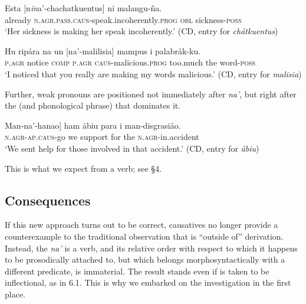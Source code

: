 \documentclass[output=paper,
modfonts
]{LSP/langsci}
\begin{document}
\begin{exe}
\begin{xlist}
\ea \label{ex:chung:28}
\ea \label{ex:chung:28a}
\gll Esta {[}n\emph{in}a'-chachatkuentus{]} ni malangu-ña.\\
already \textsc{n.agr.pass.caus-}speak.incoherently.\textsc{prog} \textsc{obl} sickness-\textsc{poss}\\
\glt `Her sickness is making her speak incoherently.' (CD, entry for \emph{chátkuentus})

\ex \label{ex:chung:28b} \gll  Hu ripåra na un {[}na'-malilisia{]} mampus i palabråk-ku.\\
\textsc{p.agr} notice \textsc{comp} \textsc{p.agr} \textsc{caus-}malicious.\textsc{prog}
too.much the word-\textsc{poss}\\
\glt `I noticed that you really are making my words malicious.' (CD, entry
for \emph{malisia})
\z
\z

Further, weak pronouns are positioned not immediately after \emph{na'},
but right after the  (and phonological phrase) that
dominates it.

\ea \label{ex:chung:29}
\gll {[}Man-na'-hanao{]} ham åbiu para i man-disgrasiåo.\\
\textsc{n.agr-ap.caus-}go we support for the \textsc{n.agr-}in.accident\\
\glt `We sent help for those involved in that accident.' (CD, entry for
\emph{åbiu})
\z

This is what we expect from a  verb; see \S4.

\subsection{Consequences}

If this new approach turns out to be correct,  causatives no
longer provide a counterexample to the traditional observation that
 is ``outside of'' derivation. Instead, the 
\emph{na'} is a  verb, and its relative order with
respect to  which it happens to be prosodically attached to,
but which belongs morphosyntactically with a different predicate, is
immaterial. The result stands even if   is taken
to be inflectional, as in 6.1. This is why we embarked on the
investigation in the first place.


\end{xlist}
\end{exe}
\end{document}
